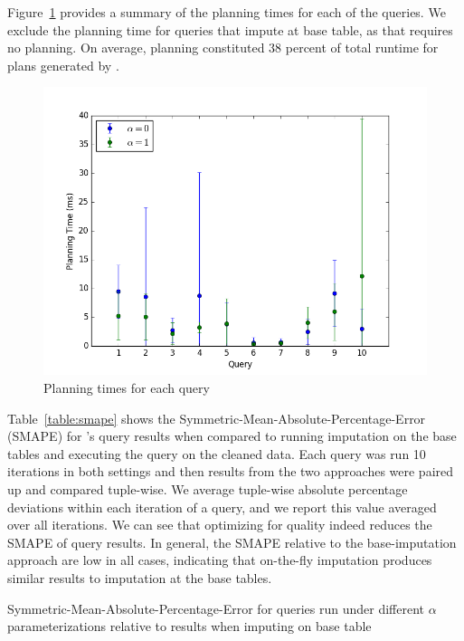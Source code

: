 Figure~\ref{fig:plantimes} provides a summary of the planning times for each of the queries.
We exclude the planning time for queries that impute at base table, as that requires no
planning. On average, planning constituted 38 percent of total runtime for plans generated
by \ProjectName{}.

\begin{figure}
\includegraphics[width=\columnwidth]{figures/planning_times_imputedb.png}
\caption{Planning times for each query}
\label{fig:plantimes}
\end{figure}

Table~\ref{table:smape} shows the Symmetric-Mean-Absolute-Percentage-Error (SMAPE) for
\ProjectName{}'s query results when compared to running imputation on the base tables and
executing the query on the
cleaned data. Each query was run 10 %
iterations in both settings and then results from the two approaches were paired up and
compared tuple-wise. We average tuple-wise absolute percentage deviations within each
iteration of a query, and we report this value averaged over all iterations.  We can see
that optimizing for quality indeed reduces the SMAPE of query results. In general, the SMAPE
relative to the base-imputation approach are low in all cases, indicating that on-the-fly
imputation produces similar results to imputation at the base tables.

\begin{table}
\centering

\caption{Symmetric-Mean-Absolute-Percentage-Error for queries run under different $\alpha$ parameterizations relative to results when imputing on base table}
\label{table:smape}
\end{table}

